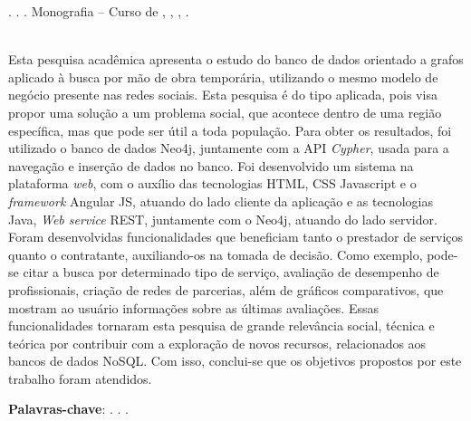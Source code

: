 
\begin{OnehalfSpacing} 

\noindent \imprimirAutorCitacaoMaiuscula. {\bfseries\imprimirtitulo}. {\imprimirdata}.  Monografia -- Curso de {\MakeUppercase\imprimircurso}, {\imprimirinstituicao}, {\imprimirlocal}, {\imprimirdata}.

\vspace{\onelineskip}
\vspace{\onelineskip}
\vspace{\onelineskip}
\vspace{\onelineskip}

\begin{resumo}
~\\
\noindent Esta pesquisa acadêmica apresenta o estudo do banco de dados orientado a grafos aplicado à busca por mão de obra temporária, utilizando o mesmo modelo de negócio presente nas redes sociais. Esta pesquisa é do tipo aplicada, pois visa propor uma solução a um problema social, que acontece dentro de uma região específica, mas que pode ser útil a toda população. Para obter os resultados, foi utilizado o banco de dados Neo4j, juntamente com a API \textit{Cypher}, usada para a navegação e inserção de dados no banco. Foi desenvolvido um sistema na plataforma \textit{web}, com o auxílio das tecnologias HTML, CSS Javascript e o \textit{framework} Angular JS, atuando do lado cliente da aplicação e as tecnologias Java, \textit{Web service} REST, juntamente com o Neo4j, atuando do lado servidor. Foram desenvolvidas funcionalidades que beneficiam tanto o prestador de serviços quanto o contratante, auxiliando-os na tomada de decisão. Como exemplo, pode-se citar a busca por determinado tipo de serviço, avaliação de desempenho de profissionais, criação de redes de parcerias, além de gráficos comparativos, que mostram ao usuário informações sobre as últimas avaliações. Essas funcionalidades tornaram esta pesquisa de grande relevância social, técnica e teórica por contribuir com a exploração de novos recursos, relacionados aos bancos de dados NoSQL. Com isso, conclui-se que os objetivos propostos por este trabalho foram atendidos.


\vspace{\onelineskip}
\vspace*{\fill}
\noindent \textbf{Palavras-chave}: \imprimirPalavraChaveUm. \imprimirPalavraChaveDois. \imprimirPalavraChaveTres.
\vspace{\onelineskip}
\end{resumo}

\end{OnehalfSpacing}
